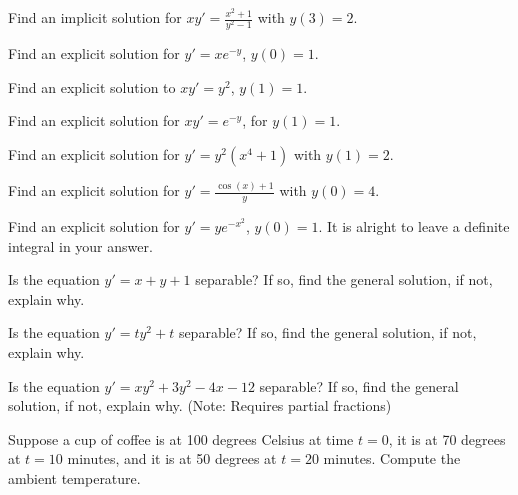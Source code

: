 \begin{exercise}
Find an implicit solution for $xy' = \frac{x^2 + 1}{y^2 - 1}$ with $y(3) = 2$.
\end{exercise}

\begin{exercise}
Find an explicit solution for $y' = xe^{-y}$, $y(0)=1$.
\end{exercise}

\begin{exercise}\ansMark%
Find an explicit solution to $x y' = y^2$, $y(1) = 1$.
\end{exercise}

\begin{exercise}
Find an explicit solution for $xy' = e^{-y}$, for $y(1)=1$.
\end{exercise}

\begin{exercise}
Find an explicit solution for $y' = y^2(x^4 + 1)$ with $y(1) = 2$. 
\end{exercise}

\begin{exercise}
Find an explicit solution for $y' = \frac{\cos(x)+ 1}{y}$ with $y(0) = 4$. 
\end{exercise}

\begin{exercise}
Find an explicit solution for $y' = ye^{-x^2}$, $y(0)=1$.  It is alright to
leave a definite integral in your answer.
\end{exercise}

\begin{exercise}
Is the equation $y' = x+y+1$ separable? If so, find the general solution, if not, explain why.
\end{exercise}

\begin{exercise}
Is the equation $y' = ty^2 + t$ separable? If so, find the general solution, if not, explain why.
\end{exercise}

\begin{exercise}
Is the equation $y' = xy^2 + 3y^2 - 4x - 12$ separable? If so, find the general solution, if not, explain why. (Note: Requires partial fractions)
\end{exercise}

\begin{exercise}
Suppose a cup of coffee is at 100 degrees Celsius at time $t=0$,
it is at 70 degrees at $t=10$ minutes, and it is at 50 degrees at $t=20$
minutes.  Compute the ambient temperature.
\end{exercise}

